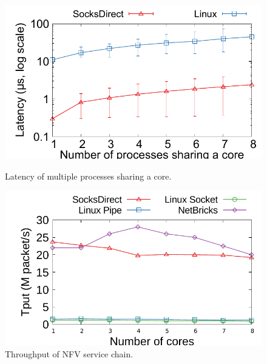 \begin{figure}[t!]
	\centering

	\hspace{0.01\textwidth}
	\begin{minipage}{.31\textwidth}
		
		\centering \includegraphics[width=\textwidth]{eval/microbenchmark/sharecore-lat.pdf}
		\vspace{-15pt}
		\caption{Latency of multiple processes sharing a core.}
		\label{fig:eval-context-switch}
	\end{minipage}
	\hspace{0.01\textwidth}
	\begin{minipage}{.31\textwidth}
		\centering
		\includegraphics[width=\textwidth]{eval/microbenchmark/nfv-tun-tput.pdf}
		\caption{Throughput of NFV service chain.}
		\label{fig:eval-tun-tput}
		

\end{minipage}
\end{figure}

